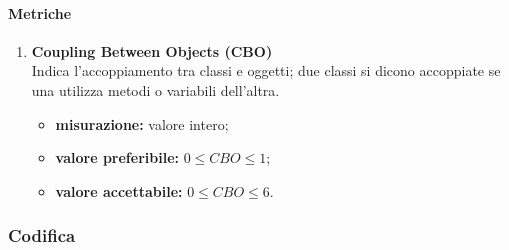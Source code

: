 \paragraph{Metriche}
\begin{enumerate}
	\item []
	      \textbf{Coupling Between Objects (CBO)}\\
	      Indica l'accoppiamento tra classi e oggetti; due classi si dicono accoppiate se una utilizza metodi o variabili dell'altra.
	      \begin{itemize}
		      \item \textbf{misurazione:} valore intero;
		      \item \textbf{valore preferibile:} $0\leq CBO\leq 1$;
		      \item \textbf{valore accettabile:} $0\leq CBO\leq 6$.
	      \end{itemize}
\end{enumerate}
\subsubsection{Codifica}
